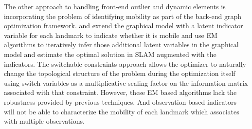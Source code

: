The other approach to handling front-end outlier and dynamic elements is
incorporating the problem of identifying mobility as part of the back-end graph
optimization framework.  \cite{haehnel03iros} and \cite{rogers2010slam} extend
the graphical model with a latent indicator variable for each landmark to
indicate whether it is mobile and use EM algorithms to iteratively infer those
additional latent variables in the graphical model and estimate the optimal
solution in SLAM augmented with the indicators. The switchable
constraints \cite{Switchable12} approach allows the optimizer to naturally
change the topological structure of the problem during the optimization itself
using switch variables as a multiplicative scaling factor on the information
matrix associated with that constraint. However, these EM based algorithms lack
the robustness provided by previous techniques.  And observation based
indicators will not be able to characterize the mobility of each landmark which
associates with multiple observations.
